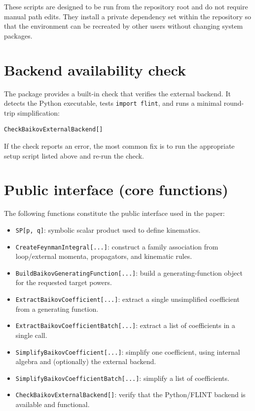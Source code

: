 These scripts are designed to be run from the repository root and do not require
manual path edits. They install a private dependency set within the repository
so that the environment can be recreated by other users without changing system
packages.

\section*{Backend availability check}
The package provides a built-in check that verifies the external backend. It
detects the Python executable, tests \texttt{import flint}, and runs a minimal
round-trip simplification:
\begin{verbatim}
CheckBaikovExternalBackend[]
\end{verbatim}

If the check reports an error, the most common fix is to run the appropriate
setup script listed above and re-run the check.

\section*{Public interface (core functions)}
The following functions constitute the public interface used in the paper:
\begin{itemize}
  \item \texttt{SP[p, q]}: symbolic scalar product used to define kinematics.
  \item \texttt{CreateFeynmanIntegral[...]}: construct a family association from
    loop/external momenta, propagators, and kinematic rules.
  \item \texttt{BuildBaikovGeneratingFunction[...]}: build a generating-function
    object for the requested target powers.
  \item \texttt{ExtractBaikovCoefficient[...]}: extract a single unsimplified
    coefficient from a generating function.
  \item \texttt{ExtractBaikovCoefficientBatch[...]}: extract a list of
    coefficients in a single call.
  \item \texttt{SimplifyBaikovCoefficient[...]}: simplify one coefficient, using
    internal algebra and (optionally) the external backend.
  \item \texttt{SimplifyBaikovCoefficientBatch[...]}: simplify a list of
    coefficients.
  \item \texttt{CheckBaikovExternalBackend[]}: verify that the Python/FLINT
    backend is available and functional.
\end{itemize}

